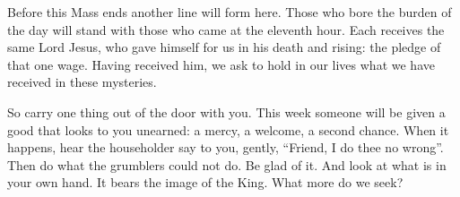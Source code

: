 Before this Mass ends another line will form here. Those who bore the burden
of the day will stand with those who came at the eleventh hour. Each receives
the same Lord Jesus, who gave himself for us in his death and rising: the
pledge of that one wage. Having received him, we ask to hold in our lives
what we have received in these mysteries.

So carry one thing out of the door with you. This week someone will be given
a good that looks to you unearned: a mercy, a welcome, a second chance. When
it happens, hear the householder say to you, gently, ``Friend, I do thee no
wrong''. Then do what the grumblers could not do. Be glad of it. And look at
what is in your own hand. It bears the image of the King. What more do we
seek?

